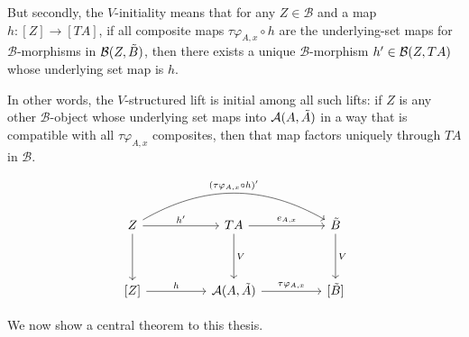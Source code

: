 \documentclass[12pt,a4paper]{article}
\def\HomA{\ensuremath\mathcal{A}}
\def\HomB{\ensuremath\mathcal{B}}
\def\t{\ensuremath\tilde}
\begin{document}
But secondly,  the $V$-initiality means that for any $Z \in \mathcal{B}$ and a map $h: [Z] \to [TA]$, if  all composite maps $\tau \varphi_{A,x} \circ h$ are the underlying-set maps for $\mathcal{B}$-morphisms in $\HomB(Z, \t B)$, then there exists a unique $\mathcal{B}$-morphism $h' \in \HomB(Z, TA)$  whose underlying set map is $h$.

In other words, the $V$-structured lift is initial among all such lifts: if $Z$ is any other $\mathcal{B}$-object whose underlying set maps into $\HomA(A, \t A)$ in a way that is compatible with all $\tau \varphi_{A,x}$ composites, then that map factors uniquely through $TA$ in $\mathcal{B}$. 



\[\begin{tikzcd}
	Z && TA && {\t B} \\
	\\
	{[Z]} && {\HomA(A, \t A)} && {[\t B]}
	\arrow["h'", from=1-1, to=1-3]
	\arrow["{ ({\tau\varphi_{A,x}\circ h})'}", bend left, from=1-1, to=1-5]
	\arrow[from=1-1, to=3-1]
	\arrow["{e_{A,x}}", from=1-3, to=1-5]
	\arrow["V", from=1-3, to=3-3]
	\arrow["V", from=1-5, to=3-5]
	\arrow["h", from=3-1, to=3-3]
	\arrow["{\tau  \varphi_{A,x}}", from=3-3, to=3-5]
\end{tikzcd}\]


We now show a central theorem to this thesis.
\end{document}
